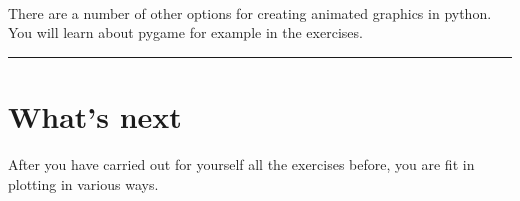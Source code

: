 \documentclass[11pt]{article}
\begin{document}
    \begin{center}
    \end{center}
    { \hspace*{\fill} \\}
    
    There are a number of other options for creating animated graphics in
python. You will learn about pygame for example in the exercises.

    \begin{center}\rule{0.5\linewidth}{\linethickness}\end{center}

\hypertarget{whats-next}{%
\section{What's next}\label{whats-next}}

    After you have carried out for yourself all the exercises before, you
are fit in plotting in various ways.


    
    
    
    
\end{document}
